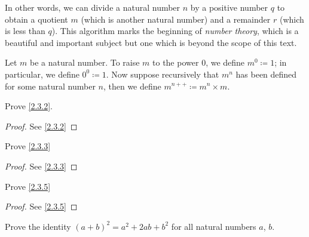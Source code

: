 \begin{rmk}\label{2.3.10}
  In other words, we can divide a natural number \(n\) by a positive number \(q\) to obtain a quotient \(m\) (which is another natural number) and a remainder \(r\) (which is less than \(q\)).
  This algorithm marks the beginning of \emph{number theory}, which is a beautiful and important subject but one which is beyond the scope of this text.
\end{rmk}

\begin{defn}\label{2.3.11}
  Let \(m\) be a natural number.
  To raise \(m\) to the power \(0\), we define \(m^0 \coloneqq 1\); in particular, we define \(0^0 \coloneqq 1\).
  Now suppose recursively that \(m^n\) has been defined for some natural number \(n\), then we define \(m^{n++} \coloneqq m^n \times m\).
\end{defn}

\exercisesection

\begin{ex}\label{ex:2.3.1}
  Prove \cref{2.3.2}.
\end{ex}

\begin{proof}
  See \cref{2.3.2}
\end{proof}

\begin{ex}\label{ex:2.3.2}
  Prove \cref{2.3.3}
\end{ex}

\begin{proof}
  See \cref{2.3.3}
\end{proof}

\begin{ex}\label{ex:2.3.3}
  Prove \cref{2.3.5}
\end{ex}

\begin{proof}
  See \cref{2.3.5}
\end{proof}

\begin{ex}\label{ex:2.3.4}
  Prove the identity \((a + b)^2 = a^2 + 2ab + b^2\) for all natural numbers \(a\), \(b\).
\end{ex}

